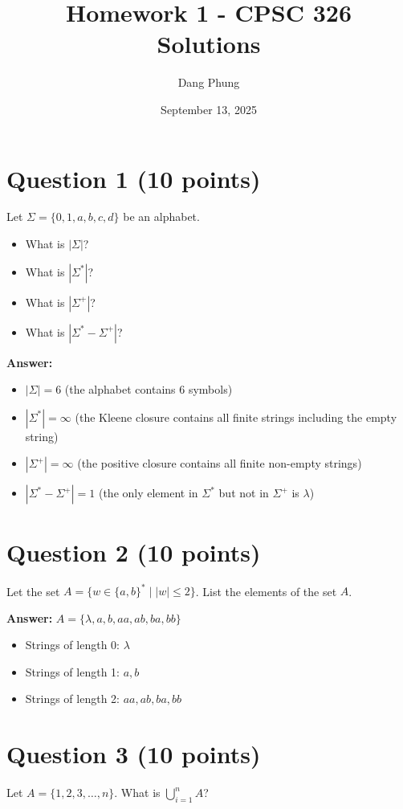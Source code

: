 \documentclass[12pt]{article}
\title{Homework 1 - CPSC 326\\Solutions}
\author{Dang Phung}
\date{September 13, 2025}
\begin{document}
\maketitle

\section*{Question 1 (10 points)}
Let $\Sigma = \{0, 1, a, b, c, d\}$ be an alphabet.
\begin{itemize}
    \item What is $|\Sigma|$?
    \item What is $|\Sigma^*|$?
    \item What is $|\Sigma^+|$?
    \item What is $|\Sigma^* - \Sigma^+|$?
\end{itemize}

\textbf{Answer:}
\begin{itemize}
    \item $|\Sigma| = 6$ (the alphabet contains 6 symbols)
    \item $|\Sigma^*| = \infty$ (the Kleene closure contains all finite strings including the empty string)
    \item $|\Sigma^+| = \infty$ (the positive closure contains all finite non-empty strings)
    \item $|\Sigma^* - \Sigma^+| = 1$ (the only element in $\Sigma^*$ but not in $\Sigma^+$ is $\lambda$)
\end{itemize}

\section*{Question 2 (10 points)}
Let the set $A = \{w \in \{a, b\}^* \mid |w| \leq 2\}$. List the elements of the set $A$.

\textbf{Answer:}
$A = \{\lambda, a, b, aa, ab, ba, bb\}$

\begin{itemize}
    \item Strings of length 0: $\lambda$
    \item Strings of length 1: $a, b$
    \item Strings of length 2: $aa, ab, ba, bb$
\end{itemize}

\section*{Question 3 (10 points)}
Let $A = \{1, 2, 3, \ldots, n\}$. What is $\bigcup_{i=1}^{n} A$?
\end{document}
